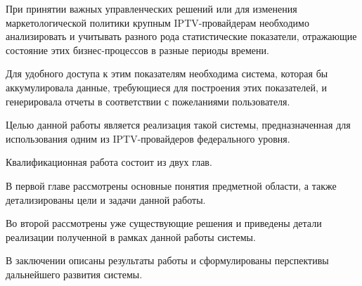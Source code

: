 \vspace{0.5cm}

При принятии важных управленческих решений или для изменения маркетологической политики крупным IPTV-провайдерам 
необходимо анализировать и учитывать разного рода статистические показатели, отражающие состояние этих бизнес-процессов 
в разные периоды времени.

Для удобного доступа к этим показателям необходима система, которая бы аккумулировала данные,
требующиеся для построения этих показателей, и генерировала отчеты в соответствии с пожеланиями пользователя.

Целью данной работы является реализация такой системы, предназначенная для использования одним из IPTV-провайдеров
федерального уровня.

Квалификационная работа состоит из двух глав.

В первой главе рассмотрены основные понятия предметной области, а также детализированы цели и задачи данной работы. 

Во второй рассмотрены уже существующие решения и приведены детали реализации полученной в рамках данной работы системы.

В заключении описаны результаты работы и сформулированы перспективы дальнейшего развития системы.

